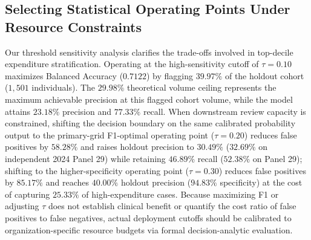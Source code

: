 \documentclass[runningheads]{llncs}
\begin{document}
\subsection{Selecting Statistical Operating Points Under Resource Constraints}
Our threshold sensitivity analysis clarifies the trade-offs involved in top-decile expenditure stratification. Operating at the high-sensitivity cutoff of $\tau = 0.10$ maximizes Balanced Accuracy ($0.7122$) by flagging $39.97\%$ of the holdout cohort ($1,501$ individuals). The $29.98\%$ theoretical volume ceiling represents the maximum achievable precision at this flagged cohort volume, while the model attains $23.18\%$ precision and $77.33\%$ recall. When downstream review capacity is constrained, shifting the decision boundary on the same calibrated probability output to the primary-grid F1-optimal operating point ($\tau = 0.20$) reduces false positives by $58.28\%$ and raises holdout precision to $30.49\%$ ($32.69\%$ on independent 2024 Panel 29) while retaining $46.89\%$ recall ($52.38\%$ on Panel 29); shifting to the higher-specificity operating point ($\tau = 0.30$) reduces false positives by $85.17\%$ and reaches $40.00\%$ holdout precision ($94.83\%$ specificity) at the cost of capturing $25.33\%$ of high-expenditure cases. Because maximizing F1 or adjusting $\tau$ does not establish clinical benefit or quantify the cost ratio of false positives to false negatives, actual deployment cutoffs should be calibrated to organization-specific resource budgets via formal decision-analytic evaluation.

\end{document}
